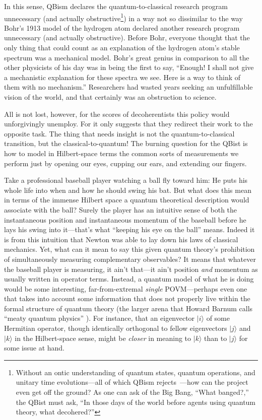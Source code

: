 \documentclass[aps,pra,superscriptaddress,10pt,tightenlines,twocolumn,nofootinbib]{revtex4}
\begin{document}
In this sense, QBism declares the quantum-to-classical research program unnecessary (and actually obstructive\footnote{Without an ontic understanding of quantum states, quantum operations, and unitary time evolutions---all of which QBism rejects~\cite{Fuchs02,RMP,Leifer06}---how can the project even get off the ground?  As one can ask of the Big Bang, ``What banged?,'' the QBist must ask, ``In those days of the world before agents using quantum theory, what decohered?''}) in a way not so dissimilar to the way Bohr's 1913 model of the hydrogen atom declared another research program unnecessary (and actually obstructive).  Before Bohr, everyone thought that the only thing that could count as an explanation of the hydrogen atom's stable spectrum was a mechanical model.  Bohr's great genius in comparison to all the other physicists of his day was in being the first to say, ``Enough!  I shall not give a mech\-anistic explanation for these spectra we see.  Here is a way to think of them with no mechanism.''  Researchers had wasted years seeking an unfulfillable vision of the world, and that certainly was an obstruction to science.

All is not lost, however, for the scores of decoherentists this policy would unforgivingly unemploy.  For it only suggests that they redirect their work to the opposite task.  The thing that needs insight is not the quantum-to-classical transition, but the classical-to-quantum!  The burning question for the QBist is how to model in Hilbert-space terms the common sorts of measurements we perform just by opening our eyes, cupping our ears, and extending our fingers.%

Take a professional baseball player watching a ball fly toward him:  He puts his whole life into when and how he should swing his bat.  But what does this mean in terms of the immense Hilbert space a quantum theoretical description would associate with the ball?  Surely the player has an intuitive sense of both the instantaneous position and instantaneous momentum of the baseball before he lays his swing into it---that's what ``keeping his eye on the ball'' means.  Indeed it is from this intuition that Newton was able to lay down his laws of classical mechanics.   Yet, what can it mean to say this given quantum theory's prohibition of simultaneously measuring complementary observables?  It means that whatever the baseball player is measuring, it ain't that---it ain't position {\it and\/} momentum as usually written in operator terms.  Instead, a quantum model of what he is doing would be some interesting, far-from-extremal {\it single\/} POVM---perhaps even one that takes into account some information that does not properly live within the formal structure of quantum theory (the larger arena that Howard Barnum calls ``meaty quantum physics'' \cite{Barnum10}). For instance, that an eigenvector $|i\rangle$ of some Hermitian operator, though identically orthogonal to fellow eigenvectors $|j\rangle$ and $|k\rangle$ in the Hilbert-space sense, might be {\it closer\/} in meaning to $|k\rangle$ than to $|j\rangle$ for some issue at hand.
\end{document}
